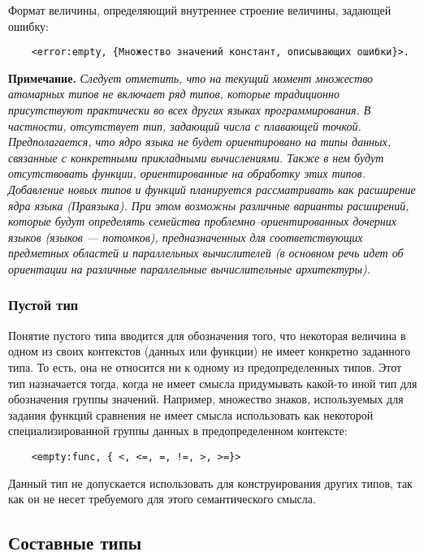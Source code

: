 {Формат величины, определяющий внутреннее строение величины, задающей ошибку:

\begin{verbatim}
	<error:empty, {Множество значений констант, описывающих ошибки}>.
\end{verbatim}


\textbf{Примечание.}
\textit{Следует отметить, что на текущий момент множество атомарных типов не включает ряд типов, которые традиционно присутствуют практически во всех других языках программирования. В частности, отсутствует тип, задающий числа с плавающей точкой. Предполагается, что ядро языка не будет ориентировано на типы данных, связанные с конкретными прикладными вычислениями. Также в нем будут отсутствовать функции, ориентированные на обработку этих типов. Добавление новых типов и функций планируется рассматривать как расширение ядра языка (Праязыка). При этом возможны различные варианты расширений, которые будут определять семейства проблемно--ориентированных дочерних языков (языков --- потомков), предназначенных для соответствующих предметных областей и параллельных вычислителей (в основном речь идет об ориентации на различные параллельные вычислительные архитектуры).}

\subsubsection{Пустой тип}

Понятие пустого типа вводится для обозначения того, что некоторая величина в одном из своих контекстов (данных или функции) не имеет конкретно заданного типа. То есть, она не относится ни к одному из предопределенных типов. Этот тип назначается тогда, когда не имеет смысла придумывать какой-то иной тип для обозначения группы значений. Например, множество знаков, используемых для задания функций сравнения не имеет смысла использовать как некоторой специализированной группы данных в предопределенном контексте:

\begin{verbatim}
	<empty:func, { <, <=, =, !=, >, >=}>
\end{verbatim}

Данный тип не допускается использовать для конструирования других типов, так как он не несет требуемого для этого семантического смысла.

\subsection{Составные типы}

}
